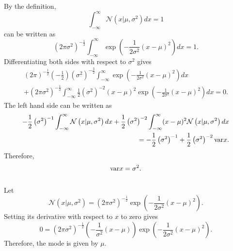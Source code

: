By the definition,  
%
\begin{equation}
\int_{- \infty}^{\infty} \mathcal{N} \left( x | \mu, \sigma ^ 2 \right) dx = 1
\end{equation}
%
can be written as
%
\begin{equation}
\left( 2 \pi \sigma ^ 2 \right) ^ {-\frac{1}{2}} \int_{-\infty}^{\infty} \exp \left( - \frac{1}{2 \sigma ^ 2} (x - \mu) ^ 2 \right) dx = 1.
\end{equation}
%
Differentiating both sides with respect to $\sigma ^ 2$ gives 
%
\begin{equation}
\begin{aligned}
\left( 2 \pi \right) ^ {-\frac{1}{2}} \left( - \frac{1}{2} \right) \left( \sigma ^ 2 \right) ^ {- \frac{3}{2}} \int_{-\infty}^{\infty} \exp \left( -\frac{1}{2 \sigma ^ 2} (x - \mu) ^ 2 \right) dx \\
+ \left( 2 \pi \sigma ^ 2 \right) ^ {-\frac{1}{2}} \int_{-\infty}^{\infty} \frac{1}{2} \left( \sigma ^ 2 \right) ^ {- 2} (x - \mu) ^ 2 \exp \left( - \frac{1}{2 \sigma ^ 2} (x - \mu) ^ 2 \right) dx = 0.
\end{aligned}
\end{equation}
%
The left hand side can be written as
%
\begin{equation}
\begin{aligned}
- \frac{1}{2} \left( \sigma ^ 2 \right) ^ {- 1} \int_{- \infty}^{\infty} \mathcal{N} \left( x | \mu, \sigma ^ 2 \right) dx + \frac{1}{2} \left( \sigma ^ 2 \right) ^ {- 2} \int_{- \infty} ^ {\infty} (x - \mu) ^ 2 \mathcal{N} \left( x | \mu, \sigma ^ 2 \right) dx \\
= - \frac{1}{2} \left( \sigma ^ 2 \right) ^ {- 1} + \frac{1}{2} \left( \sigma ^ 2 \right) ^ {- 2} {\rm var} x.
\end{aligned}
\end{equation}
%
Therefore,
%
\begin{equation}
{\rm var} x = \sigma ^ 2.
\end{equation}
%


\subsection{}
\label{1.9}
Let
%
\begin{equation}
\mathcal{N} \left( x | \mu, \sigma ^ 2 \right) = \left( 2 \pi \sigma ^ 2 \right) ^ {- \frac{1}{2}} \exp \left( - \frac{1}{2 \sigma ^ 2} (x - \mu) ^ 2 \right).
\end{equation}
%
Setting its derivative with respect to $x$ to zero gives
%
\begin{equation}
0 = \left( 2 \pi \sigma ^ 2 \right) ^ {- \frac{1}{2}} \left( - \frac{1}{\sigma ^ 2} (x - \mu) \right) \exp \left( - \frac{1}{2 \sigma ^ 2} (x - \mu) ^ 2 \right).
\end{equation}
%
Therefore, the mode is given by $\mu$.

